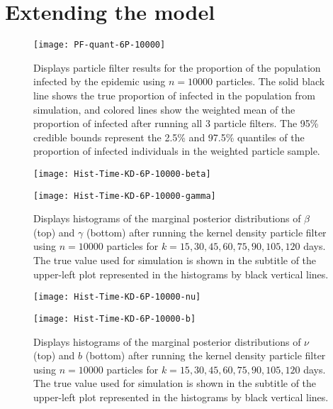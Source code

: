 \documentclass{article}
\begin{document}
\clearpage

\section{Extending the model \label{sec:extend}}

\begin{figure}[ht]
\centering
\texttt{[image: PF-quant-6P-10000]}
\caption{Displays particle filter results for the proportion of the population infected by the epidemic using $n = 10000$ particles.  The solid black line shows the true proportion of infected in the population from simulation, and colored lines show the weighted mean of the proportion of infected after running all 3 particle filters.  The 95\% credible bounds represent the 2.5\% and 97.5\% quantiles of the proportion of infected individuals in the weighted particle sample.} \label{fig:quant6P}
\end{figure}

\begin{figure}[ht]
\centering
\begin{minipage}[b]{1.0\linewidth}
\texttt{[image: Hist-Time-KD-6P-10000-beta]}
\end{minipage}
\begin{minipage}[b]{1.0\linewidth}
\texttt{[image: Hist-Time-KD-6P-10000-gamma]}
\end{minipage}
\caption{Displays histograms of the marginal posterior distributions of $\beta$ (top) and $\gamma$ (bottom) after running the kernel density particle filter using $n = 10000$ particles for $k = 15,30,45,60,75,90,105,120$ days.  The true value used for simulation is shown in the subtitle of the upper-left plot represented in the histograms by black vertical lines.} \label{fig:histbetagamma}
\end{figure}

\begin{figure}[ht]
\centering
\begin{minipage}[b]{1.0\linewidth}
\texttt{[image: Hist-Time-KD-6P-10000-nu]}
\end{minipage}
\begin{minipage}[b]{1.0\linewidth}
\texttt{[image: Hist-Time-KD-6P-10000-b]}
\end{minipage}
\caption{Displays histograms of the marginal posterior distributions of $\nu$ (top) and $b$ (bottom) after running the kernel density particle filter using $n = 10000$ particles for $k = 15,30,45,60,75,90,105,120$ days.  The true value used for simulation is shown in the subtitle of the upper-left plot represented in the histograms by black vertical lines.} \label{fig:histnub}
\end{figure}
\end{document}
